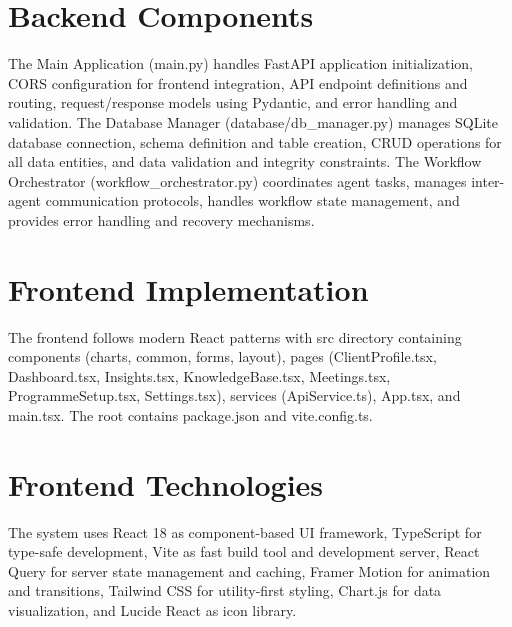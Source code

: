 \documentclass{article}
\begin{document}
\section{Backend Components}
The Main Application (main.py) handles FastAPI application initialization, CORS configuration for frontend integration, API endpoint definitions and routing, request/response models using Pydantic, and error handling and validation. The Database Manager (database/db_manager.py) manages SQLite database connection, schema definition and table creation, CRUD operations for all data entities, and data validation and integrity constraints. The Workflow Orchestrator (workflow_orchestrator.py) coordinates agent tasks, manages inter-agent communication protocols, handles workflow state management, and provides error handling and recovery mechanisms.

\section{Frontend Implementation}
The frontend follows modern React patterns with src directory containing components (charts, common, forms, layout), pages (ClientProfile.tsx, Dashboard.tsx, Insights.tsx, KnowledgeBase.tsx, Meetings.tsx, ProgrammeSetup.tsx, Settings.tsx), services (ApiService.ts), App.tsx, and main.tsx. The root contains package.json and vite.config.ts.

\section{Frontend Technologies}
The system uses React 18 as component-based UI framework, TypeScript for type-safe development, Vite as fast build tool and development server, React Query for server state management and caching, Framer Motion for animation and transitions, Tailwind CSS for utility-first styling, Chart.js for data visualization, and Lucide React as icon library.

\end{document}
